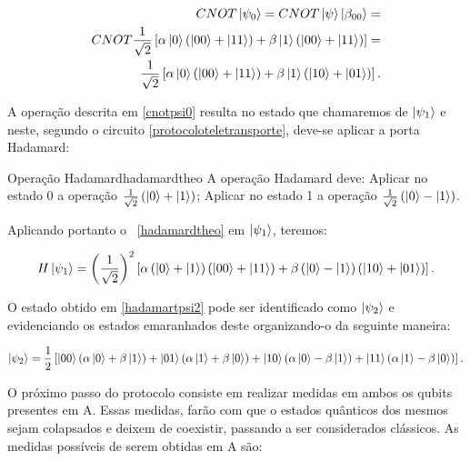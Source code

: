 \documentclass[11pt,oneside,brazil,hidelinks,article,sumario=tradicional,a4paper]{abntex2}
\begin{document}
\begin{eqnarray}\label{cnotpsi0}
CNOT \ket{\psi_0} = CNOT \ket{\psi} \ket{\beta_{00}} = \nonumber \\ 
CNOT \frac{1}{\sqrt{2}} \left[ \alpha  \ket{0} \left( \ket{00} + \ket{11} \right) + \beta \ket{1} \left( \ket{00} + \ket{11} \right)\right] = \nonumber \\
\frac{1}{\sqrt{2}} \left[\alpha \ket{0} \left( \ket{00} + \ket{11} \right) + \beta \ket{1} \left( \ket{10} + \ket{01} \right) \right].
\end{eqnarray}

A operação descrita em \ref{cnotpsi0} resulta no estado que chamaremos de $\ket{\psi_1}$ e neste, segundo o circuito \ref{protocoloteletransporte}, deve-se aplicar a porta Hadamard:

\begin{theo}{Operação Hadamard}{hadamardtheo}
A operação Hadamard deve: Aplicar no estado 0 a operação $\frac{1}{\sqrt{2}} \left(\ket{0}+\ket{1}\right)$; Aplicar no estado 1 a operação $\frac{1}{\sqrt{2}}\left(\ket{0}-\ket{1}\right)$.
\end{theo}

Aplicando portanto o ~\ref{hadamardtheo} em $\ket{\psi_1}$, teremos:

\begin{equation}\label{hadamartpsi2}
 H \ket{\psi_1} = \left( \frac{1}{\sqrt{2}}\right)^{2} \left[ \alpha \left( \ket{0} + \ket{1} \right)\left( \ket{00} +\ket{11} \right)+ \beta \left( \ket{0} - \ket{1} \right) \left( \ket{10} + \ket{01} \right) \right].
\end{equation}

O estado obtido em \ref{hadamartpsi2} pode ser identificado como $\ket{\psi_2}$ e 
evidenciando os estados emaranhados deste organizando-o da seguinte maneira:

\begin{equation}\label{psi2}
 \ket{\psi_2} = \frac{1}{2} \left[ \ket{00} ( \alpha \ket{0} + \beta \ket{1} ) + \ket{01} ( \alpha \ket{1} + \beta \ket{0} ) + \ket{10} ( \alpha \ket{0} - \beta \ket{1} ) + \ket{11} ( \alpha \ket{1} - \beta \ket{0} ) \right].
\end{equation}

O próximo passo do protocolo consiste em realizar medidas em ambos os qubits presentes em A. Essas medidas, farão com que o estados quânticos dos mesmos sejam colapsados e deixem de coexistir, passando a ser considerados clássicos. As medidas possíveis de serem obtidas em A são:
\end{document}
